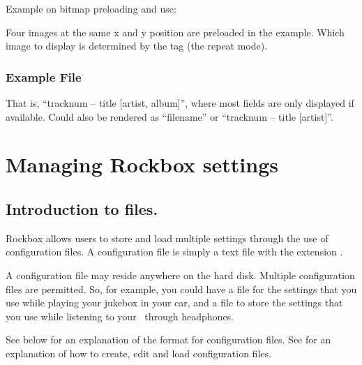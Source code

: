 Example on bitmap preloading and use:
\begin{example}
\end{example}
Four images at the same x and y position are preloaded in the example. Which 
image to display is determined by the  tag (the repeat mode).

\subsubsection{Example File}
\begin{example}
\end{example}
That is, ``tracknum -- title [artist, album]'', where most fields are only
displayed if available. Could also be rendered as ``filename'' or ``tracknum --
title [artist]''.

%  

\section{\label{ref:manage_settings}Managing Rockbox settings}

\subsection{Introduction to  files.}
Rockbox allows users to store and load multiple settings through the use of 
configuration files.  A configuration file is simply a text file with the 
extension .  

A configuration file may reside anywhere on the hard disk. Multiple
configuration files are permitted. So, for example, you could have
a  file for the settings that you use while playing your
jukebox in your car, and a  file to store the
settings that you use while listening to your \dap\ through headphones.

See  below for an explanation of the format 
for configuration files.  See  for an 
explanation of how to create, edit and load configuration files.

